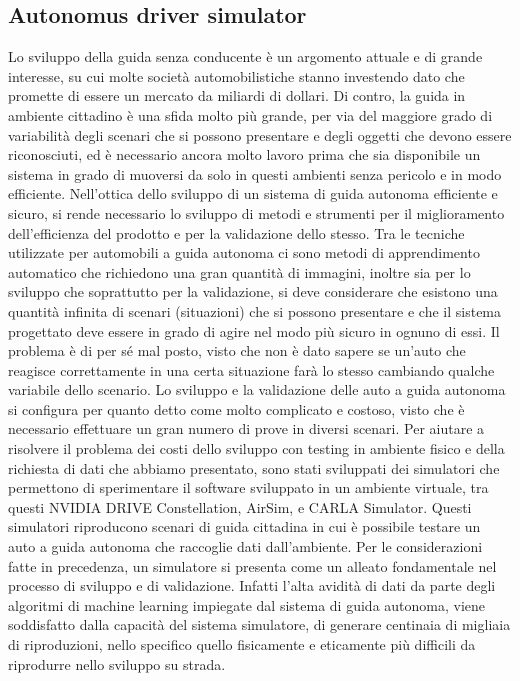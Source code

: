 \documentclass[14pt]{extarticle}
\begin{document}
\subsection{Autonomus driver simulator}
Lo sviluppo della guida senza conducente è un argomento attuale e di
grande interesse, su cui molte società automobilistiche stanno investendo
dato che promette di essere un mercato da miliardi di dollari. %
Di contro, la guida in ambiente cittadino è una sfida
molto più grande, per via del maggiore grado di variabilità degli scenari
che si possono presentare e degli oggetti che devono essere riconosciuti,
ed è necessario ancora molto lavoro prima che sia disponibile un sistema
in grado di muoversi da solo in questi ambienti senza pericolo e in modo
efficiente.
Nell'ottica dello sviluppo di un sistema di guida autonoma efficiente
e sicuro, si rende necessario lo sviluppo di metodi e strumenti per il
miglioramento dell'efficienza del prodotto e per la validazione dello
stesso. Tra le tecniche utilizzate per automobili a guida autonoma ci sono
metodi di apprendimento automatico che richiedono una gran quantità di
immagini, inoltre sia per lo sviluppo che soprattutto per la validazione, si
deve considerare che esistono una quantità infinita di scenari (situazioni)
che si possono presentare e che il sistema progettato deve essere in grado
di agire nel modo più sicuro in ognuno di essi. Il problema è di per sé mal
posto, visto che non è dato sapere se un'auto che reagisce correttamente
in una certa situazione farà lo stesso cambiando qualche variabile dello
scenario.
Lo sviluppo e la validazione delle auto a guida autonoma si configura
per quanto detto come molto complicato e costoso, visto che è necessario
effettuare un gran numero di prove in diversi scenari.
Per aiutare a risolvere il problema dei costi dello sviluppo con testing
in ambiente fisico e della richiesta di dati che abbiamo presentato, sono
stati sviluppati dei simulatori che permettono di sperimentare il software
sviluppato in un ambiente virtuale, tra questi NVIDIA DRIVE Constellation, AirSim, e CARLA Simulator. Questi simulatori riproducono scenari di guida cittadina
in cui è possibile testare un auto a guida autonoma che raccoglie dati
dall'ambiente. Per le considerazioni fatte in precedenza, un simulatore
si presenta come un alleato fondamentale nel processo di sviluppo e di
validazione. Infatti l'alta avidità di dati da parte degli algoritmi di machine learning impiegate dal sistema di guida autonoma, viene soddisfatto dalla capacità del sistema simulatore, di generare centinaia di migliaia di riproduzioni, nello specifico quello fisicamente e eticamente più difficili da riprodurre nello sviluppo su strada.

\end{document}
